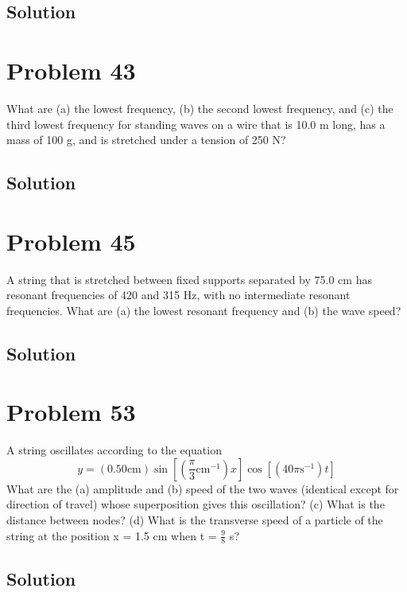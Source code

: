 \documentclass[12pt]{article}
\begin{document}
        \subsection{Solution}

    \section{Problem 43}
        What are (a) the lowest frequency, (b) the second lowest frequency, and (c) the third lowest frequency for standing waves on a wire that is 10.0 m long, has a mass of 100 g, and is stretched under a tension of 250 N?

        \subsection{Solution}

    \section{Problem 45}
        A string that is stretched between fixed supports separated by 75.0 cm has resonant frequencies of 420 and 315 Hz, with no intermediate resonant frequencies. 
        What are (a) the lowest resonant frequency and (b) the wave speed?

        \subsection{Solution}

    \section{Problem 53}
        A string oscillates according to the equation
        \begin{equation}
            y = (0.50 \unit{\centi\meter}) \sin \left[  ( \frac{\pi}{3} \unit{\centi\meter^{-1}})x \right] \cos\left[ (40\pi \unit{\second^{-1}} )t \right]
        \end{equation}
        What are the (a) amplitude and (b) speed of the two waves (identical except for direction of travel) whose superposition gives this oscillation? 
        (c) What is the distance between nodes? 
        (d) What is the transverse speed of a particle of the string at the position x = 1.5 cm when t = $\frac{9}{8}$ s?

        \subsection{Solution}
\end{document}
